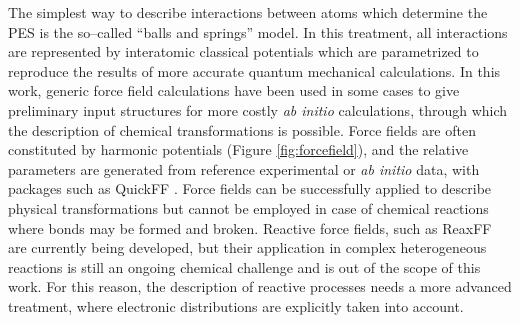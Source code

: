 The simplest way to describe interactions between atoms which determine the PES is the so--called ``balls and springs'' model. In this treatment, all interactions are represented by interatomic classical potentials which are parametrized to reproduce the results of more accurate quantum mechanical calculations. In this work, generic force field calculations have been used in some cases to give preliminary input structures for more costly \textit{ab initio} calculations, through which the description of chemical transformations is possible. 
Force fields are often constituted by harmonic potentials (Figure \ref{fig:forcefield}), and the relative parameters are generated from reference experimental or \textit{ab initio} data, with packages such as QuickFF \cite{vanduyfhuys2015quickff}. Force fields can be successfully applied to describe physical transformations but cannot be employed in case of chemical reactions where bonds may be formed and broken.
Reactive force fields, such as ReaxFF \cite{VanDuin2001} are currently being developed, but their application in complex heterogeneous reactions is still an ongoing chemical challenge and is out of the scope of this work. For this reason, the description of reactive processes needs a more advanced treatment, where electronic distributions are explicitly taken into account.

